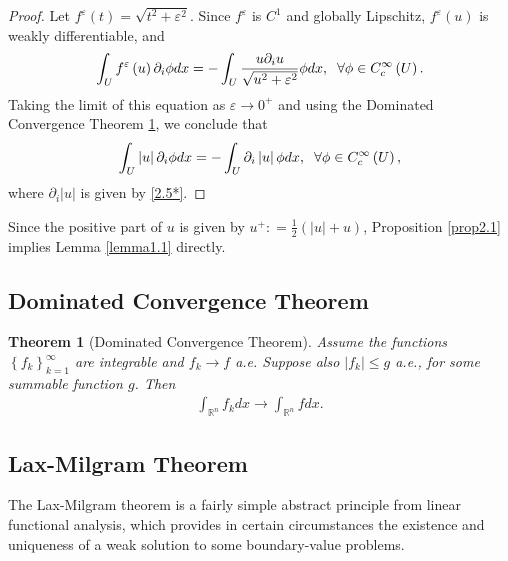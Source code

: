 \documentclass[11pt,a4paper,center,notitlepage]{article}
\numberwithin{equation}{section}
\newtheorem{theorem}{Theorem}[section]
\begin{document}
\begin{proof}
Let ${f^\varepsilon }\left( t \right) = \sqrt {{t^2} + {\varepsilon ^2}}$. Since $f^\varepsilon$ is $C^1$ and globally Lipschitz, $f^\varepsilon \left(u\right)$ is weakly differentiable, and
\begin{align}
\int_U {{f^\varepsilon }\left( u \right){\partial _i}\phi dx}  =  - \int_U {\frac{{u{\partial _i}u}}{{\sqrt {{u^2} + {\varepsilon ^2}} }}\phi dx} ,\hspace{2mm} \forall \phi  \in C_c^\infty \left( U \right).
\end{align}
Taking the limit of this equation as $\varepsilon \to 0^+$ and using the Dominated Convergence Theorem \ref{theorem2.1}, we conclude that
\begin{align}
\int_U {\left| u \right|{\partial _i}\phi dx}  =  - \int_U {{\partial _i}\left| u \right|\phi dx} ,\hspace{2mm} \forall \phi  \in C_c^\infty \left( U \right),
\end{align}
where ${{\partial _i}\left| u \right|}$ is given by \eqref{2.5*}.
\end{proof}
Since the positive part of $u$ is given by ${u^ + }: = \frac{1}{2}\left( {\left| u \right| + u} \right)$, Proposition \ref{prop2.1} implies Lemma \ref{lemma1.1} directly.

\subsection{Dominated Convergence Theorem}
\begin{theorem}[Dominated Convergence Theorem]\label{theorem2.1}
Assume the functions $\left\{ {{f_k}} \right\}_{k = 1}^\infty$ are integrable and $f_k \to f$ a.e. Suppose also $\left| {{f_k}} \right| \le g$ a.e., for some summable function $g$. Then
\begin{align}
\int_{{\mathbb{R}^n}} {{f_k}dx}  \to \int_{{\mathbb{R}^n}} {fdx} .
\end{align}
\end{theorem}

\subsection{Lax-Milgram Theorem}
The Lax-Milgram theorem is a fairly simple abstract principle from linear functional analysis, which provides in certain circumstances the existence and uniqueness of a weak solution to some boundary-value problems. 
\end{document}
